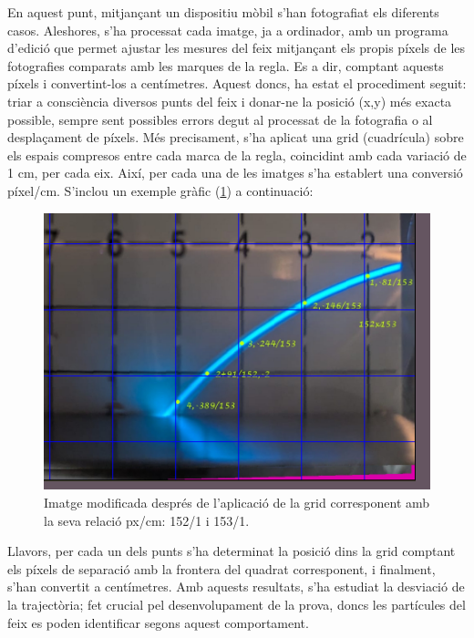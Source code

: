 \documentclass[11pt]{article}
\begin{document}
En aquest punt, mitjançant un dispositiu mòbil s'han fotografiat els diferents casos. Aleshores, s'ha processat cada imatge, ja a ordinador, amb un programa d'edició que permet ajustar les mesures del feix mitjançant els propis píxels de les fotografies comparats amb les marques de la regla. Es a dir, comptant aquests píxels i convertint-los a centímetres. Aquest doncs, ha estat el procediment seguit: triar a consciència diversos punts del feix i donar-ne la posició (x,y) més exacta possible, sempre sent possibles errors degut al processat de la fotografia o al desplaçament de píxels. Més precisament, s'ha aplicat una grid (cuadrícula) sobre els espais compresos entre cada marca de la regla, coincidint amb cada variació de 1 cm, per cada eix. Així, per cada una de les imatges s'ha establert una conversió píxel/cm. S'inclou un exemple gràfic (\ref{fig: ex_grid}) a continuació:

\begin{figure}[H]
    \centering
    \includegraphics[scale=0.3]{Ex_grid.png}
    \caption{Imatge modificada després de l'aplicació de la grid corresponent amb la seva relació px/cm: 152/1 i 153/1.}
    \label{fig: ex_grid}
\end{figure}


Llavors, per cada un dels punts s'ha determinat la posició dins la grid comptant els píxels de separació amb la frontera del quadrat corresponent, i finalment, s'han convertit a centímetres. Amb aquests resultats, s'ha estudiat la desviació de la trajectòria; fet crucial pel desenvolupament de la prova, doncs les partícules del feix es poden identificar segons aquest comportament.
\end{document}
